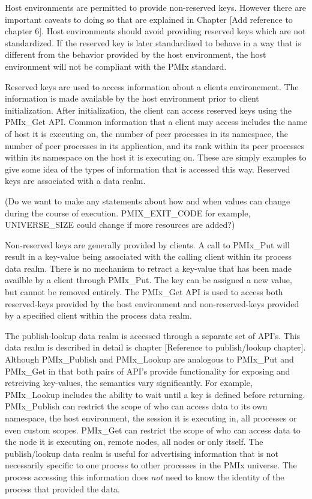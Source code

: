 Host environments are permitted to provide non-reserved keys.  However there are important caveats to 
doing so that are explained in Chapter [Add reference to chapter 6].
Host environments should avoid providing reserved keys which are not standardized.  
If the reserved key is later standardized to behave in a way that is different from the behavior 
provided by the host environment, the host environment will not be compliant with the PMIx standard.
 
Reserved keys are used to access information about a clients environement.
The information is made available by the host environment prior to client initialization.
After initialization, the client can access reserved keys using the PMIx_Get API.  
Common information that a client may access includes 
the name of host it is executing on, 
the number of peer processes in its namespace,
the number of peer processes in its application,
and its rank within its peer processes within its namespace on the host it is executing on.   
These are simply examples to give some idea of the types of information that is accessed this way.
Reserved keys are associated with a data realm.

(Do we want to make any statements about how and when values can change during the course of execution.
 PMIX_EXIT_CODE for example, UNIVERSE_SIZE could change if more resources are added?)

Non-reserved keys are generally provided by clients.
A call to PMIx_Put will result in a key-value being associated with the calling client within 
its process data realm.
There is no mechanism to retract a key-value that has been made availble by a client through PMIx_Put.
The key can be assigned a new value, but cannot be removed entirely.
The PMIx_Get API is used to access both reserved-keys provided by the host environment and 
non-reserved-keys provided by a specified client within the process data realm. 

The publish-lookup data realm is accessed through a separate set of API's.
This data realm is described in detail is chapter [Reference to publish/lookup chapter].
Although PMIx_Publish and PMIx_Lookup are analogous to PMIx_Put and PMIx_Get in that both pairs 
of API's provide functionality for exposing and retreiving key-values, the semantics vary significantly.  
For example, PMIx_Lookup includes the ability to wait until a key is defined before returning.
PMIx_Publish can restrict the scope of who can access data to its own namespace, the host environment, the session it is executing in, all processes or even custom scopes. 
PMIx_Get can restrict the scope of who can access data to the node it is executing on, remote nodes, 
all nodes or only itself.
The publish/lookup data realm is useful for advertising information that is not necessarily specific to one process to other processes in the \ac{PMIx} universe.
The process accessing this information does \emph{not} need to know the identity of the process that provided the data.


